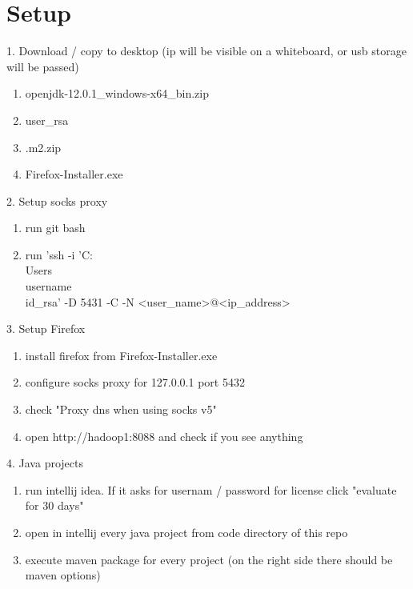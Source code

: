 \documentclass{article}
\begin{document}
\section*{Setup}

1. Download / copy to desktop (ip will be visible on a whiteboard, or usb storage will be passed)
\begin{enumerate}
\item openjdk-12.0.1\_windows-x64\_bin.zip
\item user\_rsa
\item .m2.zip
\item Firefox-Installer.exe
\end{enumerate}

2. Setup socks proxy
\begin{enumerate}
\item run git bash
\item run 'ssh -i 'C:\\Users\\username\\id\_rsa' -D 5431 -C -N <user\_name>@<ip\_address>
\end{enumerate}

3. Setup Firefox
\begin{enumerate}
\item install firefox from Firefox-Installer.exe
\item configure socks proxy for 127.0.0.1 port 5432
\item check "Proxy dns when using socks v5"
\item open http://hadoop1:8088 and check if you see anything
\end{enumerate}

4. Java projects
\begin{enumerate}
\item run intellij idea. If it asks for usernam / password for license click "evaluate for 30 days"
\item open in intellij every java project from code directory of this repo
\item execute maven package for every project (on the right side there should be maven options)
\end{enumerate}
\end{document}
